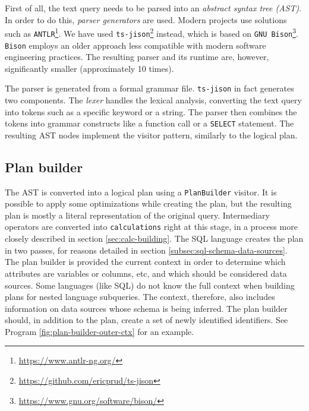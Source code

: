 First of all, the text query needs to be parsed into an \textit{abstract syntax tree (AST)}. In order to do this, \textit{parser generators} are used. Modern projects use solutions such as \texttt{ANTLR}\footnote{\url{https://www.antlr-ng.org/}}. We have used 
\texttt{ts-jison}\footnote{\url{https://github.com/ericprud/ts-jison}} instead, which is based on \texttt{GNU Bison}\footnote{\url{https://www.gnu.org/software/bison/}}. \texttt{Bison} employs an older approach less compatible with modern software engineering practices. The resulting parser and its runtime are, however, significantly smaller (approximately 10 times).

The parser is generated from a formal grammar file. \texttt{ts-jison} in fact generates two components. The \textit{lexer} handles the lexical analysis, converting the text query into tokens such as a specific keyword or a string. The parser then combines the tokens into grammar constructs like a function call or a \texttt{SELECT} statement. The resulting AST nodes implement the visitor pattern, similarly to the logical plan.

\subsection{Plan builder}

The AST is converted into a logical plan using a \texttt{PlanBuilder} visitor. It is possible to apply some optimizations while creating the plan, but the resulting plan is mostly a literal representation of the original query. Intermediary operators are converted into \texttt{calculations} right at this stage, in a process more closely described in section \ref{sec:calc-building}. The SQL language creates the plan in two passes, for reasons detailed in section \ref{subsec:sql-schema-data-sources}. The plan builder is provided the current context in order to determine which attributes are variables or columns, etc, and which should be considered data sources. Some languages (like SQL) do not know the full context when building plans for nested language subqueries. The context, therefore, also includes information on data sources whose schema is being inferred. The plan builder should, in addition to the plan, create a set of newly identified identifiers. See Program \ref{fig:plan-builder-outer-ctx} for an example.

